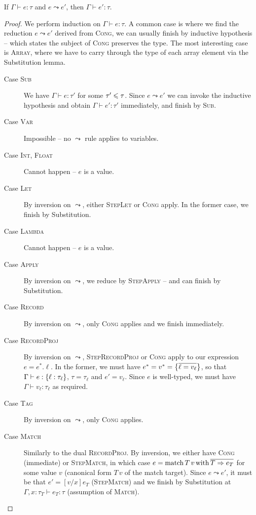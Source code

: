 \begin{theorem}[Preservation]
    If $\Gamma \vdash e : \tau$ and $e \leadsto e'$, then $\Gamma \vdash e' : \tau$.
\end{theorem}
\begin{proof}
We perform induction on $\Gamma \vdash e : \tau$. A common case is where we find the reduction $e \leadsto e'$ derived from \textsc{Cong}, we can usually finish by inductive hypothesis -- which states the subject of \textsc{Cong} preserves the type. The most interesting case is \textsc{Array}, where we have to carry through the type of each array element via the Substitution lemma.

\begin{description}
    \item[Case \textsc{Sub}] We have $\Gamma \vdash e : \tau'$ for some $\tau' \leqslant \tau$. Since $e \leadsto e'$ we can invoke the inductive hypothesis and obtain $\Gamma \vdash e' : \tau'$ immediately, and finish by \textsc{Sub}.
    \item[Case \textsc{Var}] Impossible -- no $\leadsto$ rule applies to variables.
    \item[Case \textsc{Int}, \textsc{Float}] Cannot happen -- $e$ is a value.
    \item[Case \textsc{Let}] By inversion on $\leadsto$, either \textsc{StepLet} or \textsc{Cong} apply. In the former case, we finish by Substitution.
    \item[Case \textsc{Lambda}] Cannot happen -- $e$ is a value.
    \item[Case \textsc{Apply}] By inversion on $\leadsto$, we reduce by \textsc{StepApply} -- and can finish by Substitution.
    \item[Case \textsc{Record}] By inversion on $\leadsto$, only \textsc{Cong} applies and we finish immediately.
    \item[Case \textsc{RecordProj}] By inversion on $\leadsto$,  \textsc{StepRecordProj} or \textsc{Cong} apply to our expression $e = e^*{.}\ell$. In the former, we must have $e^* = v^* = \srecordval{\overline{\ell = v_\ell}}$, so that $\Gamma \vdash e : \srecordtype{\ell : \tau_\ell}$, $\tau = \tau_\ell$ and $e' = v_\ell$. Since $e$ is well-typed, we must have $\Gamma \vdash v_\ell : \tau_\ell$ as required.
    \item[Case \textsc{Tag}] By inversion on $\leadsto$, only \textsc{Cong} applies.
    \item[Case \textsc{Match}] Similarly to the dual \textsc{RecordProj}. By inversion, we either have \textsc{Cong} (immediate) or \textsc{StepMatch}, in which case $e = \mathrm{match}\,{T\,v}\,\mathrm{with}\,{\overline{T \Rightarrow e_T}}$ for some value $v$ (canonical form $T\,v$ of the match target). Since $e \leadsto e'$, it must be that $e' = [v/x]e_T$ (\textsc{StepMatch}) and we finish by Substitution at $\Gamma, x : \tau_T \vdash e_T : \tau$ (assumption of \textsc{Match}).

\end{description}
\end{proof}
